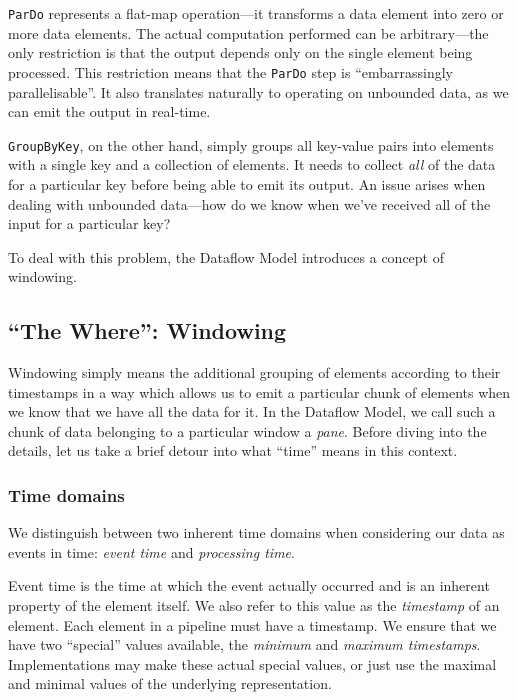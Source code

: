 
\verb|ParDo| represents a flat-map operation---it transforms a data element into zero or more data elements.
The actual computation performed can be arbitrary---the only restriction is that the output depends only on the single element being processed.
This restriction means that the \verb|ParDo| step is ``embarrassingly parallelisable''.
It also translates naturally to operating on unbounded data, as we can emit the output in real-time.

\verb|GroupByKey|, on the other hand, simply groups all key-value pairs into elements with a single key and a collection of elements.
It needs to collect \emph{all} of the data for a particular key before being able to emit its output.
An issue arises when dealing with unbounded data---how do we know when we've received all of the input for a particular key?

To deal with this problem, the Dataflow Model introduces a concept of windowing.


\subsection{``The Where'': Windowing}\label{sec:prep:dataflow:where}

Windowing simply means the additional grouping of elements according to their timestamps in a way which allows us to emit a particular chunk of elements when we know that we have all the data for it.
In the Dataflow Model, we call such a chunk of data belonging to a particular window a \emph{pane}.
Before diving into the details, let us take a brief detour into what ``time'' means in this context.

\subsubsection{Time domains}
We distinguish between two inherent time domains when considering our data as events in time: \emph{event time} and \emph{processing time}.

Event time is the time at which the event actually occurred and is an inherent property of the element itself.
We also refer to this value as the \emph{timestamp} of an element.
Each element in a pipeline must have a timestamp.
We ensure that we have two ``special'' values available, the \emph{minimum} and \emph{maximum timestamps}.
Implementations may make these actual special values, or just use the maximal and minimal values of the underlying representation.

